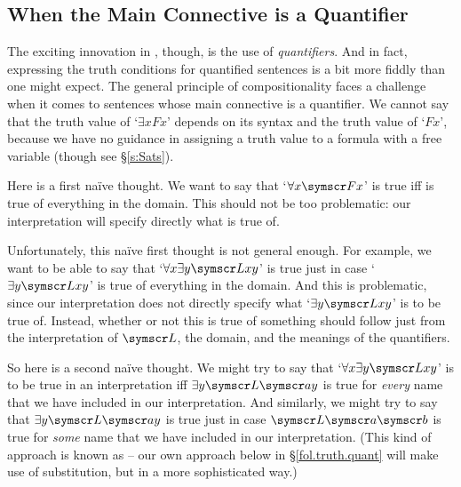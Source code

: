\begin{earg}
\section{When the Main Connective is a Quantifier}

The exciting innovation in \FOL, though, is the use of \emph{quantifiers}. And in fact, expressing the truth conditions for quantified sentences is a bit more fiddly than one might expect. The general principle of compositionality faces a challenge when it comes to sentences whose main connective is a quantifier. We cannot say that the truth value of `$\exists x Fx$' depends on its syntax and the truth value of `$Fx$', because we have no guidance in assigning a truth value to a formula with a free variable (though see §\ref{s:Sats}).

Here is a first naïve thought. We want to say that `$\forall x \meta{F}x$' is true iff  is true of everything in the domain. This should not be too problematic: our interpretation will specify directly what  is true of. 

Unfortunately, this naïve first thought is not general enough. For example, we want to be able to say that `$\forall x \exists y \meta{L}xy$' is true just in case `$\exists y \meta{L}xy$' is true of everything in the domain. And this is problematic, since our interpretation does not directly specify what `$\exists y \meta{L}xy$' is to be true of. Instead, whether or not this is true of something should follow just from the interpretation of $\meta{L}$, the domain, and the meanings of the quantifiers. 

So here is a second naïve thought. We might try to say that `$\forall x \exists y \meta{L}xy$' is to be true in an interpretation iff $\exists y \meta{L}\meta{a}y$ is true for \emph{every} name  that we have included in our interpretation. And similarly, we might try to say that $\exists y \meta{L}\meta{a}y$ is true just in case $\meta{L}\meta{a}\meta{b}$ is true for \emph{some} name  that we have included in our interpretation. (This kind of approach is known as  – our own approach below in §\ref{fol.truth.quant} will make use of substitution, but in a more sophisticated way.)


\end{earg}
